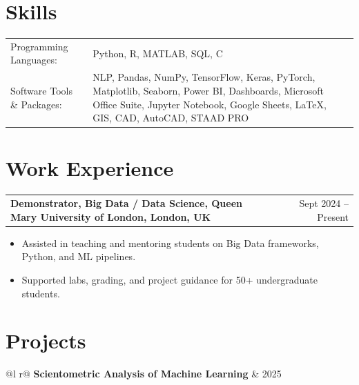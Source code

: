 \documentclass[a4paper,10pt]{article}
\makeatletter
\newenvironment{joblong}[2]
    {
    \begin{tabularx}{\linewidth}{@{}l X r@{}}
    \textbf{#1} & \hfill &  #2 \\[2pt]
    \end{tabularx}
    \begin{minipage}[t]{\linewidth}
    \begin{itemize}[nosep,leftmargin=1em, itemsep=2pt,label=--]
    }
    {
    \end{itemize}
    \end{minipage}    
    }
\makeatother
\begin{document}
\section{Skills}
\begin{tabularx}{\linewidth}{@{}l X@{}}
Programming Languages: & Python, R, MATLAB, SQL, C \\
Software Tools \& Packages: & NLP, Pandas, NumPy, TensorFlow, Keras, PyTorch, Matplotlib, Seaborn, Power BI, Dashboards, Microsoft Office Suite, Jupyter Notebook, Google Sheets, LaTeX, GIS, CAD, AutoCAD, STAAD PRO \\
\end{tabularx}

\section{Work Experience}

\begin{joblong}{Demonstrator, Big Data / Data Science, Queen Mary University of London, London, UK}{Sept 2024 -- Present}
\item Assisted in teaching and mentoring students on Big Data frameworks, Python, and ML pipelines.  
\item Supported labs, grading, and project guidance for 50+ undergraduate students.  
\end{joblong}

\section{Projects}

\begin{tabularx}{\linewidth}{ @{}l r@{} }
\textbf{Scientometric Analysis of Machine Learning} & \hfill 2025 \\
 \\
\end{tabularx}
\end{document}
